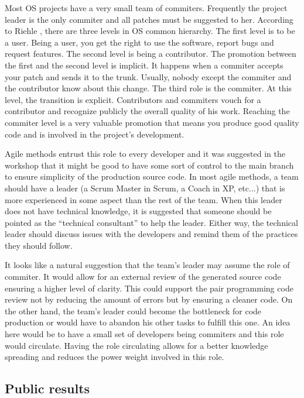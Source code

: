 Most OS projects have a very small team of commiters. Frequently the
project leader is the only commiter and all patches must be suggested
to her. According to Riehle \cite{Riehle2007}, there are three levels
in OS common hierarchy. The first level is to be a user. Being a user,
you get the right to use the software, report bugs and request
features. The second level is being a contributor. The promotion
between the first and the second level is implicit. It happens when a
commiter accepts your patch and sends it to the trunk. Usually, nobody
except the commiter and the contributor know about this change. The
third role is the commiter. At this level, the transition is
explicit. Contributors and commiters vouch for a contributor and
recognize publicly the overall quality of his work. Reaching the
commiter level is a very valuable promotion that means you produce
good quality code and is involved in the project's development.

Agile methods entrust this role to every developer and it was
suggested in the workshop that it might be good to have some sort of
control to the main branch to ensure simplicity of the production
source code. In most agile methods, a team should have a leader (a
Scrum Master in Scrum, a Coach in XP, etc...) that is more experienced
in some aspect than the rest of the team. When this leader does not
have technical knowledge, it is suggested that someone should be
pointed as the ``technical consultant'' to help the leader. Either
way, the technical leader should discuss issues with the developers
and remind them of the practices they should follow.

It looks like a natural suggestion that the team's leader may assume
the role of commiter. It would allow for an external review of the
generated source code ensuring a higher level of clarity. This could
support the pair programming code review not by reducing the amount of
errors but by ensuring a cleaner code. On the other hand, the team's
leader could become the bottleneck for code production or would have
to abandon his other tasks to fulfill this one. An idea here would be
to have a small set of developers being commiters and this role would
circulate. Having the role circulating allows for a better knowledge
spreading and reduces the power weight involved in this role.

\subsection{Public results}
\label{subsec:publicity}

